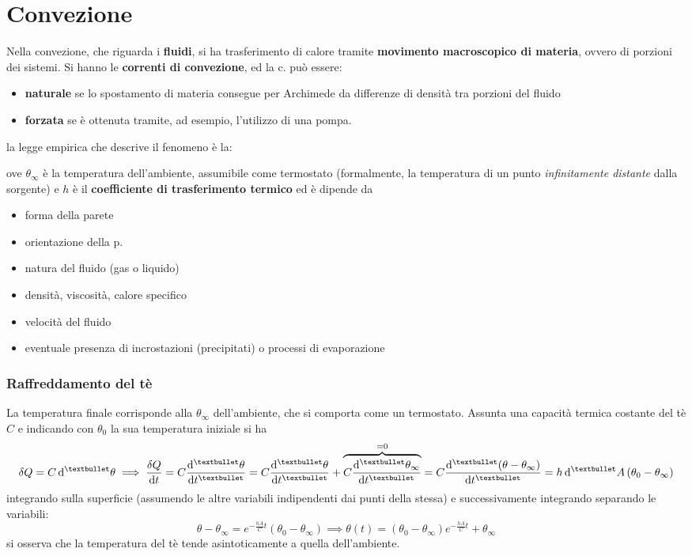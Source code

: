 \documentclass[10pt, oneside]{book}
\newcommand{\lawbox}[2]{\begin{center}
\framebox{
\parbox{\linewidth}{
\vspace{0.3cm}
\textbf{#1} \hfill $\displaystyle #2$
\vspace{0.3cm}
}
}
\end{center}}
\newcommand{\ds}{\displaystyle}
\begin{document}
\section{Convezione}
Nella convezione, che riguarda i \textbf{fluidi}, si ha trasferimento di calore tramite \textbf{movimento macroscopico di materia}, ovvero di porzioni dei sistemi. Si hanno le \textbf{correnti di convezione}, ed la c. può essere:
\begin{itemize}
\item \textbf{naturale} se lo spostamento di materia consegue per Archimede da differenze di densità tra porzioni del fluido
\item \textbf{forzata} se è ottenuta tramite, ad esempio, l'utilizzo di una pompa.
\end{itemize}
la legge empirica che descrive il fenomeno è la:
\lawbox{Legge (empirica) di Newton}{\frac{\delta Q}{\mathrm{d} t} = h \dd[•]{A} (\theta_0 - \theta_\infty)}
ove $\theta_\infty$ è la temperatura dell'ambiente, assumibile come termostato (formalmente, la temperatura di un punto \textit{infinitamente distante} dalla sorgente) e $h$ è il \textbf{coefficiente di trasferimento termico} ed è dipende da
\begin{itemize}
\item forma della parete
\item orientazione della p.
\item natura del fluido (gas o liquido)
\item densità, viscosità, calore specifico
\item velocità del fluido
\item eventuale presenza di incrostazioni (precipitati) o processi di evaporazione
\end{itemize}

\subsubsection*{Raffreddamento del tè}
La temperatura finale corrisponde alla $\theta_\infty$ dell'ambiente, che si comporta come un termostato. Assunta una capacità termica costante del tè $C$ e indicando con $\theta_0$ la sua temperatura iniziale si ha
\[\delta Q = C \dd[•]{\theta} \implies \frac{\delta Q}{\mathrm{d} t} = C \dv[•]{\theta}{t} = C \dv[•]{\theta}{t} + \overbrace{C \dv[•]{\theta_{\infty}}{t}}^{= 0} = C \dv[•]{(\theta - \theta_\infty)}{t}  = h \dd[•]{A} (\theta_0 - \theta_\infty)\]
integrando sulla superficie (assumendo le altre variabili indipendenti dai punti della stessa) e successivamente integrando separando le variabili:
\[\theta - \theta_\infty = e^{- \frac{hA}{C}t}(\theta_0 - \theta_\infty) \implies \boxed{\theta(t) = (\theta_0 - \theta_\infty) e^{\ds - \frac{hA}{C}t} + \theta_\infty}\]
si osserva che la temperatura del tè tende asintoticamente a quella dell'ambiente.
\end{document}
